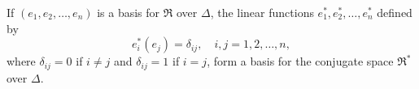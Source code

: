 If $(e_1, e_2, \dots, e_n)$ is a basis for $\mathfrak{R}$ over $\Delta$, the linear functions $e_1^*, e_2^*, \dots, e_n^*$ defined by
$$
e_i^*(e_j) = \delta_{ij}, \quad i, j = 1, 2, \dots, n,
$$
where $\delta_{ij} = 0$ if $i \neq j$ and $\delta_{ij} = 1$ if $i = j$, form a basis for the conjugate space $\mathfrak{R}^*$ over $\Delta$.
